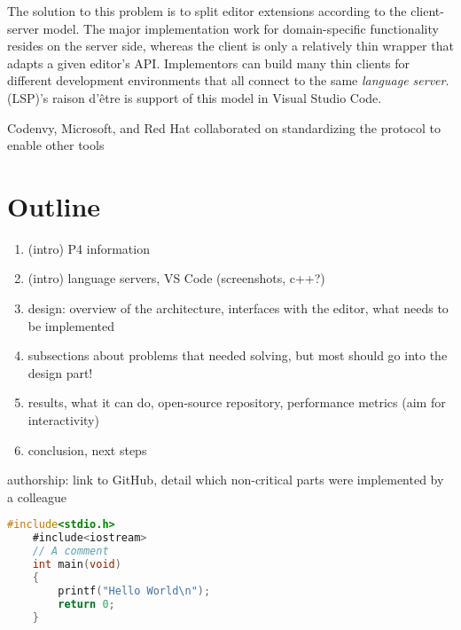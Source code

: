 The solution to this problem is to split editor extensions according to the
client-server model. The major implementation work for domain-specific
functionality resides on the server side, whereas the client is only a
relatively thin wrapper that adapts a given editor's API. Implementors can build
many thin clients for different development environments that all connect to the
same \textit{language server}. (LSP)'s raison d'être is support of this model in
Visual Studio Code.

Codenvy, Microsoft, and Red Hat collaborated on standardizing the protocol to
enable other tools %

\section{Outline}

\begin{enumerate}
  \item (intro) P4 information
  \item (intro) language servers, VS Code (screenshots, c++?)
  \item design: overview of the architecture, interfaces with the editor, what
        needs to be implemented
  \item subsections about problems that needed solving, but most should go into
        the design part!
  \item results, what it can do, open-source repository, performance metrics
        (aim for interactivity)
  \item conclusion, next steps
\end{enumerate}


authorship: link to GitHub, detail which non-critical parts were implemented by
a colleague


\begin{lstlisting}[caption={~Zbytečný kód},label=list:8-6,captionpos=t,float,abovecaptionskip=-\medskipamount,belowcaptionskip=\medskipamount,language=C]
    #include<stdio.h>
    #include<iostream>
    // A comment
    int main(void)
    {
        printf("Hello World\n");
        return 0;
    }
\end{lstlisting}

